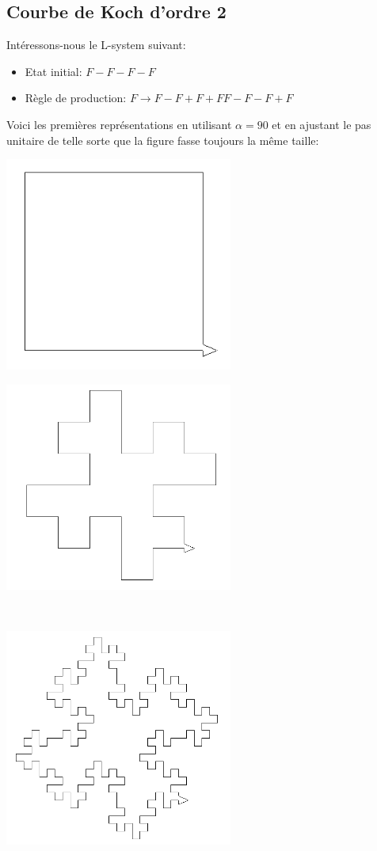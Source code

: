 \subsection{Courbe de Koch d'ordre 2}
\noindent Intéressons-nous le L-system suivant:
\begin{itemize}
 \item[\textbullet] Etat initial: $F-F-F-F$
 \item[\textbullet] Règle de production: $F\rightarrow F-F+F+FF-F-F+F$
\end{itemize}
Voici les premières représentations en utilisant $\alpha=90$ et en ajustant le pas unitaire de telle sorte que la figure fasse toujours la même taille:
\begin{center}
\begin{minipage}{7.5cm}
 \includegraphics[width=7.5cm]{images/linden-koch1.png}
\end{minipage}
\begin{minipage}{7.5cm}
 \includegraphics[width=7.5cm]{images/linden-koch2.png}
\end{minipage}\\
\begin{minipage}{7.5cm}
 \includegraphics[width=7.5cm]{images/linden-koch3.png}

\end{minipage}
\end{center}
